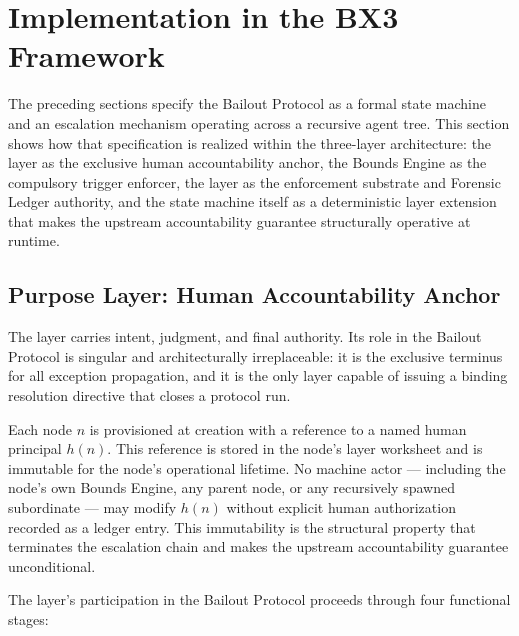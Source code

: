 \section{Implementation in the BX3 Framework}\label{sec:implementation}

The preceding sections specify the Bailout Protocol as a formal state machine and an escalation mechanism operating across a recursive agent tree. This section shows how that specification is realized within the \bxthree{} three-layer architecture: the \purpose{} layer as the exclusive human accountability anchor, the Bounds Engine as the compulsory trigger enforcer, the \fact{} layer as the enforcement substrate and Forensic Ledger authority, and the state machine itself as a deterministic \fact{} layer extension that makes the upstream accountability guarantee structurally operative at runtime.

\subsection{Purpose Layer: Human Accountability Anchor}\label{sec:purpose-layer}

The \purpose{} layer carries intent, judgment, and final authority. Its role in the Bailout Protocol is singular and architecturally irreplaceable: it is the exclusive terminus for all exception propagation, and it is the only layer capable of issuing a binding resolution directive that closes a protocol run.

Each \bxthree{} node $n$ is provisioned at creation with a reference to a named human principal $h(n)$. This reference is stored in the node's \purpose{} layer worksheet and is immutable for the node's operational lifetime. No machine actor --- including the node's own Bounds Engine, any parent node, or any recursively spawned subordinate --- may modify $h(n)$ without explicit human authorization recorded as a ledger entry. This immutability is the structural property that terminates the escalation chain and makes the upstream accountability guarantee unconditional.

The \purpose{} layer's participation in the Bailout Protocol proceeds through four functional stages:

